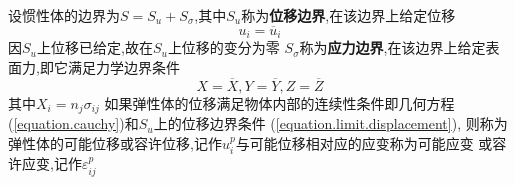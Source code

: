 \documentclass{book}
\begin{document}
设惯性体的边界为$S=S_u+S_{\sigma}$,其中$S_u$称为\textbf{位移边界},在该边界上给定位移
\begin{equation}
u_i=\overline{u}_i
\label{equation.limit.displacement}
\end{equation}
因$S_u$上位移已给定,故在$S_u$上位移的变分为零
$S_\sigma$称为\textbf{应力边界},在该边界上给定表面力,即它满足力学边界条件
\begin{equation}
X=\overline{X},
Y=\overline{Y},
Z=\overline{Z}
\label{equation.limit.contraint}
\end{equation}
其中$X_i=n_j \sigma_{ij}$
如果弹性体的位移满足物体内部的连续性条件即几何方程(\ref{equation.cauchy})和$S_u$上的位移边界条件 (\ref{equation.limit.displacement}),
则称为弹性体的可能位移或容许位移,记作$u_i^p$与可能位移相对应的应变称为可能应变 或容许应变,记作$\varepsilon_{ij}^p$
\end{document}
